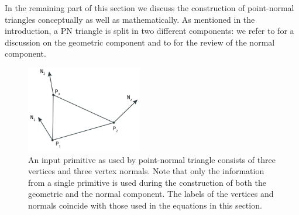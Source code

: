 In the remaining part of this section we discuss the construction of point-normal triangles conceptually as well as mathematically. As mentioned in the introduction, a PN triangle is split in two different components: we refer to  for a discussion on the geometric component and to  for the review of the normal component.

\begin{figure}
	\centering
	\includegraphics[width=0.45\textwidth]{./content/img/method/input.png}
	\caption{An input primitive as used by point-normal triangle consists of three vertices and three vertex normals. Note that only the information from a single primitive is used during the construction of both the geometric and the normal component. The labels of the vertices and normals coincide with those used in the equations in this section.}
	\label{fig:method:input_primitive}
\end{figure}




